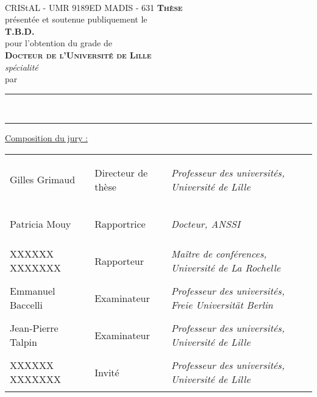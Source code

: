 \begin{titlepage}
    \sffamily
    \begin{center}
	{
        	\def\svgwidth{20 em}
		\\
		{\tiny{CRIStAL - UMR 9189}\hfil{ED MADIS - 631}}
	}
        \vfil
	{
		{
			{\Huge{\textsc{\textbf{Thèse}}}}
		}\\[1 em]
		{
			{présentée et soutenue publiquement le}\\
			{\textbf{T.B.D.}}
		}\\[1 em]
		{
			{pour l'obtention du grade de}\\
			{\LARGE{\textsc{\textbf{Docteur de l'Université de Lille}}}}\\
			{\large\textit{spécialité \printProgram}}
		}\\[1 em]
		{
			{par}\\[0.3 em]
			{\Large\textbf{\printAuthor}}
		}
	}
        \vfil
        {\LARGE
            \rule[1 ex]{\textwidth}{1.5 pt}
            \onehalfspacing\printTitleBold\\[1 ex]
            \rule[-1 ex]{\textwidth}{1.5 pt}
        }
    \end{center}
    
    \vfil
	{\small \centering \underline{Composition du jury :}}
    \begin{table}[h]
	\small
        \sffamily 
        {%
	    \begin{tabular}{
		>{\raggedright\arraybackslash}p{}
		>{\bfseries\raggedright\arraybackslash}p{}%
		>{\itshape\raggedleft\arraybackslash}p{}
	    }
		Gilles Grimaud	& Directeur de thèse	& Professeur des universités, Université de Lille\\
		Patricia Mouy	& Rapportrice		& Docteur, ANSSI\\
		XXXXXX XXXXXXX	& Rapporteur		& Maître de conférences, Université de La Rochelle\\
		Emmanuel Baccelli	& Examinateur		& Professeur des universités, Freie Universität Berlin\\
		Jean-Pierre Talpin	& Examinateur		& Professeur des universités, Université de Lille\\
		XXXXXX XXXXXXX	& Invité		& Professeur des universités, Université de Lille\\
            \end{tabular}
        }
    \end{table}
\end{titlepage}

\restoregeometry
